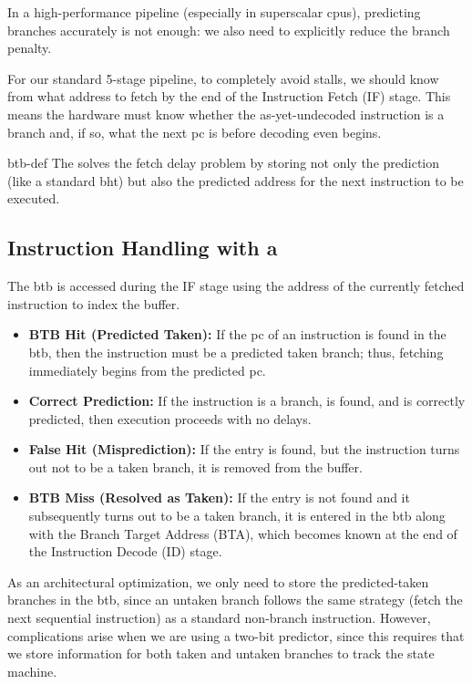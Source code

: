 In a high-performance pipeline (especially in superscalar \glspl{cpu}), predicting branches accurately is not enough: we also need to explicitly reduce the branch penalty. 

For our standard 5-stage pipeline, to completely avoid stalls, we should know from what address to fetch by the end of the Instruction Fetch (IF) stage. This means the hardware must know whether the as-yet-undecoded instruction is a branch and, if so, what the next \gls{pc} is before decoding even begins.

\begin{concept}{}{btb-def}
    The  solves the fetch delay problem by storing not only the prediction (like a standard \gls{bht}) but also the predicted address for the next instruction to be executed.
\end{concept}

\subsection{Instruction Handling with a }

The \gls{btb} is accessed during the IF stage using the address of the currently fetched instruction to index the buffer. 

\begin{itemize}
    \item \textbf{BTB Hit (Predicted Taken):} If the \gls{pc} of an instruction is found in the \gls{btb}, then the instruction must be a predicted taken branch; thus, fetching immediately begins from the predicted \gls{pc}. 
    \item \textbf{Correct Prediction:} If the instruction is a branch, is found, and is correctly predicted, then execution proceeds with no delays.
    \item \textbf{False Hit (Misprediction):} If the entry is found, but the instruction turns out not to be a taken branch, it is removed from the buffer.
    \item \textbf{BTB Miss (Resolved as Taken):} If the entry is not found and it subsequently turns out to be a taken branch, it is entered in the \gls{btb} along with the Branch Target Address (BTA), which becomes known at the end of the Instruction Decode (ID) stage.
\end{itemize}

As an architectural optimization, we only need to store the predicted-taken branches in the \gls{btb}, since an untaken branch follows the same strategy (fetch the next sequential instruction) as a standard non-branch instruction. However, complications arise when we are using a two-bit predictor, since this requires that we store information for both taken and untaken branches to track the state machine.

